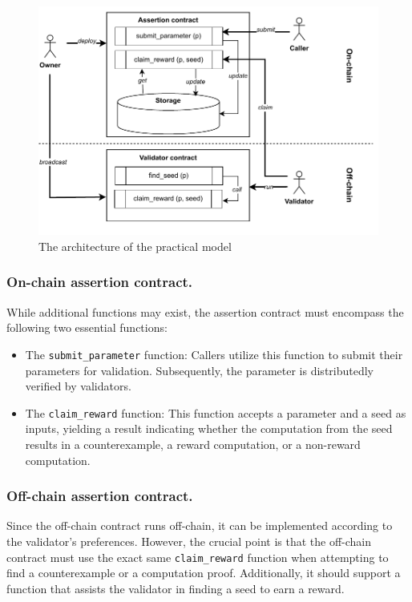\documentclass[runningheads]{llncs}
\begin{document}
\begin{figure}
\centering
\includegraphics[scale=.8]{assertion}
\caption{The architecture of the practical model}
\label{fig.architect}
\end{figure}
\subsubsection{On-chain assertion contract.}
While additional functions may exist, the assertion contract must encompass the following two essential functions:
\begin{itemize}
\item The \lstinline|submit_parameter| function: Callers utilize this function to submit their parameters for validation. Subsequently, the parameter is distributedly verified by validators.
\item  The \lstinline|claim_reward| function: This function accepts a parameter and a seed as inputs, yielding a result indicating whether the computation from the seed results in a counterexample, a reward computation, or a non-reward computation.
\end{itemize}
\subsubsection{Off-chain assertion contract.}
Since the off-chain contract runs off-chain, it can be implemented according to the validator's preferences. However, the crucial point is that the off-chain contract must use the exact same \lstinline|claim_reward| function when attempting to find a counterexample or a computation proof. Additionally, it should support a function that assists the validator in finding a seed to earn a reward.
\end{document}
